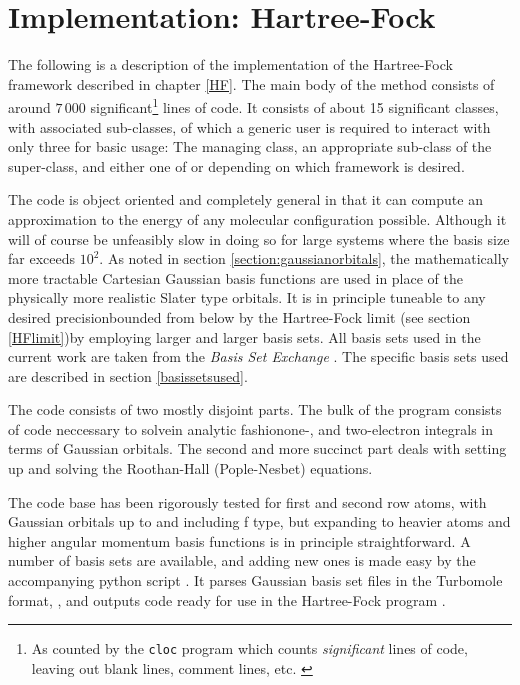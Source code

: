 \documentclass[../../master.tex]{subfiles}
\begin{document}
\chapter{Implementation: Hartree-Fock\label{HFI}}
The following is a description of the implementation of the Hartree-Fock framework described in chapter \ref{HF}. The main body of the method consists of around $7\,000$ significant\footnote{As counted by the \lstinline{cloc} program which counts \emph{significant} lines of code, leaving out blank lines, comment lines, etc. \cite{cloc}} lines of \CC{}  code. It consists of about 15 significant classes, with associated sub-classes, of which a generic user is required to interact with only three for basic usage: The managing  class, an appropriate sub-class of the  super-class, and either one of  or  depending on which framework is desired.

The code is object oriented and completely general in that it can compute an approximation to the energy of any molecular configuration possible. Although it will of course be unfeasibly slow in doing so for large systems where the basis size far exceeds $10^2$. As noted in section \ref{section:gaussianorbitals}, the mathematically more tractable Cartesian Gaussian basis functions are used in place of the physically more realistic Slater type orbitals. It is in principle tuneable to any desired precision\textemdash bounded from below by the Hartree-Fock limit (see section \ref{HFlimit})\textemdash by employing larger and larger basis sets. All basis sets used in the current work are taken from the \emph{Basis Set Exchange} \cite{basissetexchange}. The specific basis sets used are described in section \ref{basissetsused}.

The code consists of two mostly disjoint parts. The bulk of the program consists of code neccessary to solve\textemdash in analytic fashion\textemdash one-, and two-electron integrals in terms of Gaussian orbitals. The second and more succinct part deals with setting up and solving the Roothan-Hall (Pople-Nesbet) equations. 


The code base has been rigorously tested for first and second row atoms, with Gaussian orbitals up to and including f type, but expanding to heavier atoms and higher angular momentum basis functions is in principle straightforward. A number of basis sets are available, and adding new ones is made easy by the accompanying python script . It parses Gaussian basis set files in the Turbomole format, , and outputs \CC{}  code ready for use in the Hartree-Fock program \cite{TURBOMOLE}. 
\end{document}
